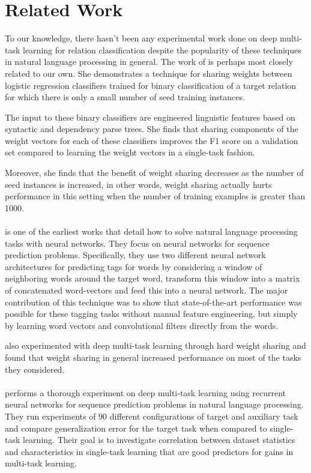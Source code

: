 \section{Related Work}
To our knowledge, there hasn't been any experimental work done on deep multi-task learning for relation classification despite the popularity of these techniques in natural language processing in general. The work of \citet{jiang2009} is perhaps most closely related to our own. She demonstrates a technique for sharing weights between logistic regression classifiers trained for binary classification of a target relation for which there is only a small number of seed training instances. 

The input to these binary classifiers are engineered linguistic features based on syntactic and dependency parse trees. She finds that sharing components of the weight vectors for each of these classifiers improves the F1 score on a validation set compared to learning the weight vectors in a single-task fashion.

Moreover, she finds that the benefit of weight sharing decreases as the number of seed instances is increased, in other words, weight sharing actually hurts performance in this setting when the number of training examples is greater than 1000.
\\\\
\citet{collobert2011} is one of the earliest works that detail how to solve natural language processing tasks with neural networks. They focus on neural networks for sequence prediction problems. Specifically, they use two different neural network architectures for predicting tags for words by considering a window of neighboring words around the target word, transform this window into a matrix of concatenated word-vectors and feed this into a neural network. The major contribution of this technique was to show that state-of-the-art performance was possible for these tagging tasks without manual feature engineering, but simply by learning word vectors and convolutional filters directly from the words.

\citet{collobert2011} also experimented with deep multi-task learning through hard weight sharing and found that weight sharing in general increased performance on most of the tasks they considered.
\\\\
\citet{bingel2017} performs a thorough experiment on deep multi-task learning using recurrent neural networks for sequence prediction problems in natural language processing. They run experiments of 90 different configurations of target and auxiliary task and compare generalization error for the target task when compared to single-task learning. Their goal is to investigate correlation between dataset statistics and characteristics in single-task learning that are good predictors for gains in multi-task learning.

